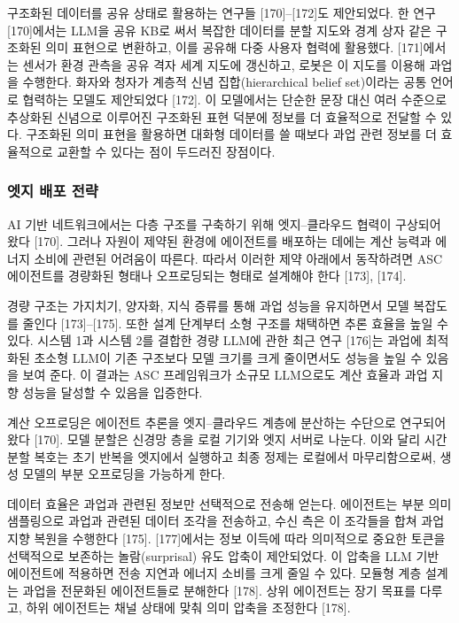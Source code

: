 구조화된 데이터를 공유 상태로 활용하는 연구들 [170]--[172]도 제안되었다. 한 연구 [170]에서는 LLM을 공유 KB로 써서 복잡한 데이터를 분할 지도와 경계 상자 같은 구조화된 의미 표현으로 변환하고, 이를 공유해 다중 사용자 협력에 활용했다. [171]에서는 센서가 환경 관측을 공유 격자 세계 지도에 갱신하고, 로봇은 이 지도를 이용해 과업을 수행한다. 화자와 청자가 계층적 신념 집합(hierarchical belief set)이라는 공통 언어로 협력하는 모델도 제안되었다 [172]. 이 모델에서는 단순한 문장 대신 여러 수준으로 추상화된 신념으로 이루어진 구조화된 표현 덕분에 정보를 더 효율적으로 전달할 수 있다. 구조화된 의미 표현을 활용하면 대화형 데이터를 쓸 때보다 과업 관련 정보를 더 효율적으로 교환할 수 있다는 점이 두드러진 장점이다.

\subsubsection{엣지 배포 전략}
AI 기반 네트워크에서는 다층 구조를 구축하기 위해 엣지--클라우드 협력이 구상되어 왔다 [170]. 그러나 자원이 제약된 환경에 에이전트를 배포하는 데에는 계산 능력과 에너지 소비에 관련된 어려움이 따른다. 따라서 이러한 제약 아래에서 동작하려면 ASC 에이전트를 경량화된 형태나 오프로딩되는 형태로 설계해야 한다 [173], [174].

경량 구조는 가지치기, 양자화, 지식 증류를 통해 과업 성능을 유지하면서 모델 복잡도를 줄인다 [173]--[175]. 또한 설계 단계부터 소형 구조를 채택하면 추론 효율을 높일 수 있다. 시스템 1과 시스템 2를 결합한 경량 LLM에 관한 최근 연구 [176]는 과업에 최적화된 초소형 LLM이 기존 구조보다 모델 크기를 크게 줄이면서도 성능을 높일 수 있음을 보여 준다. 이 결과는 ASC 프레임워크가 소규모 LLM으로도 계산 효율과 과업 지향 성능을 달성할 수 있음을 입증한다.

계산 오프로딩은 에이전트 추론을 엣지--클라우드 계층에 분산하는 수단으로 연구되어 왔다 [170]. 모델 분할은 신경망 층을 로컬 기기와 엣지 서버로 나눈다. 이와 달리 시간 분할 복호는 초기 반복을 엣지에서 실행하고 최종 정제는 로컬에서 마무리함으로써, 생성 모델의 부분 오프로딩을 가능하게 한다.

데이터 효율은 과업과 관련된 정보만 선택적으로 전송해 얻는다. 에이전트는 부분 의미 샘플링으로 과업과 관련된 데이터 조각을 전송하고, 수신 측은 이 조각들을 합쳐 과업 지향 복원을 수행한다 [175]. [177]에서는 정보 이득에 따라 의미적으로 중요한 토큰을 선택적으로 보존하는 놀람(surprisal) 유도 압축이 제안되었다. 이 압축을 LLM 기반 에이전트에 적용하면 전송 지연과 에너지 소비를 크게 줄일 수 있다. 모듈형 계층 설계는 과업을 전문화된 에이전트들로 분해한다 [178]. 상위 에이전트는 장기 목표를 다루고, 하위 에이전트는 채널 상태에 맞춰 의미 압축을 조정한다 [178].

